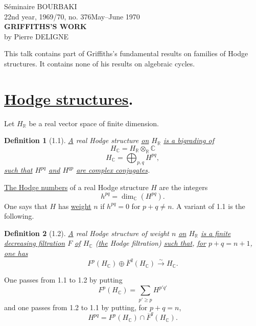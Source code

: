 \documentclass[10pt,leqno]{article}
\newcommand{\C}{\mathbb C}
\newcommand{\R}{\mathbb R}
\theoremstyle{deligne}
\newtheorem*{definition}{Definition}
\renewcommand{\underline}[1]{\uline{#1}}
\begin{document}
\begin{center}
Séminaire BOURBAKI\\
22nd year, 1969/70, no. 376\hfill May--June 1970\\[2.2em]
{\Large\bfseries GRIFFITHS'S WORK}\\[1.2em]
by Pierre DELIGNE
\end{center}

This talk contains part of Griffiths's fundamental results on families of Hodge structures. It contains none of his results on algebraic cycles.

\section{\underline{Hodge structures}.}

Let $H_\R$ be a real vector space of finite dimension.

\begin{definition}[1.1]
\underline{A} real Hodge structure \underline{on} $H_\R$ \underline{is a bigrading of}
\[
H_\C=H_\R\otimes_\R\C
\]
\[
H_\C=\bigoplus_{p,q}H^{pq},
\]
\underline{such that} $H^{pq}$ \underline{and} $H^{qp}$ \underline{are complex conjugates}.
\end{definition}

\underline{The Hodge numbers} of a real Hodge structure $H$ are the integers
\[
h^{pq}=\dim_\C(H^{pq}).
\]
One says that $H$ has \underline{weight} $n$ if $h^{pq}=0$ for $p+q\ne n$. A variant of 1.1 is the following.

\begin{definition}[1.2]
\underline{A} real Hodge structure of weight $n$ \underline{on} $H_\R$ \underline{is a finite decreasing filtration} $F$ \underline{of} $H_\C$ (\underline{the} Hodge filtration) \underline{such that}, \underline{for} $p+q=n+1$, \underline{one has}
\begin{equation}
F^p(H_\C)\oplus \overline F^{q}(H_\C)\xrightarrow{\sim}H_\C .
\tag{1.2.1}
\end{equation}
\end{definition}

One passes from 1.1 to 1.2 by putting
\begin{equation}
F^p(H_\C)=\sum_{p'\ge p}H^{p'q'}
\tag{1.2.2}
\end{equation}
and one passes from 1.2 to 1.1 by putting, for $p+q=n$,
\begin{equation}
H^{pq}=F^p(H_\C)\cap \overline F^{q}(H_\C) .
\tag{1.2.3}
\end{equation}
\end{document}
